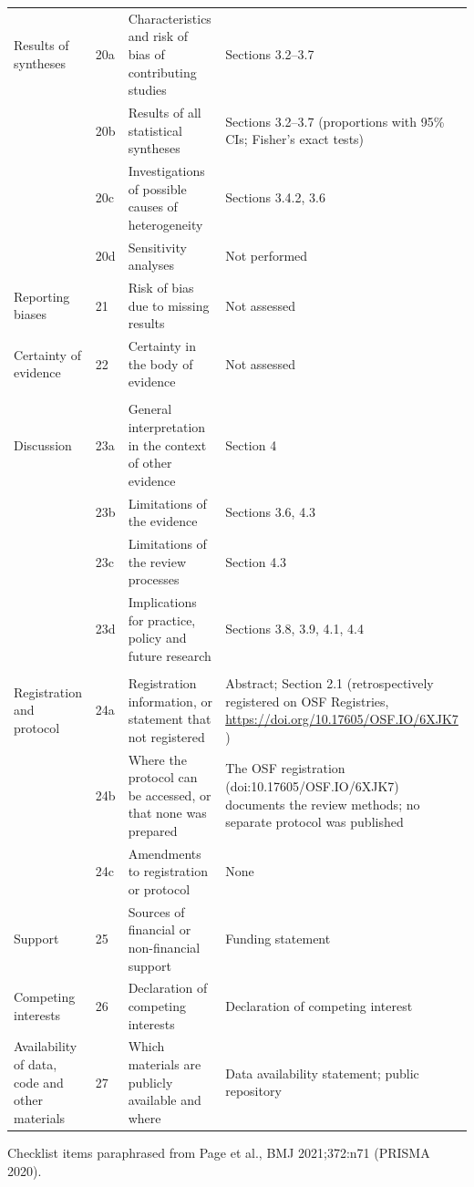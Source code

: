 \begin{longtable}{>{\raggedright\arraybackslash}p{3.6cm} l >{\raggedright\arraybackslash}p{6.2cm} >{\raggedright\arraybackslash}p{5.2cm}}
Results of syntheses & 20a & Characteristics and risk of bias of contributing studies & Sections 3.2--3.7\\
 & 20b & Results of all statistical syntheses & Sections 3.2--3.7 (proportions with 95\% CIs; Fisher's exact tests)\\
 & 20c & Investigations of possible causes of heterogeneity & Sections 3.4.2, 3.6\\
 & 20d & Sensitivity analyses & Not performed\\
Reporting biases & 21 & Risk of bias due to missing results & Not assessed\\
Certainty of evidence & 22 & Certainty in the body of evidence & Not assessed\\
\multicolumn{4}{l}{\textbf{DISCUSSION}}\\
Discussion & 23a & General interpretation in the context of other evidence & Section 4\\
 & 23b & Limitations of the evidence & Sections 3.6, 4.3\\
 & 23c & Limitations of the review processes & Section 4.3\\
 & 23d & Implications for practice, policy and future research & Sections 3.8, 3.9, 4.1, 4.4\\
\multicolumn{4}{l}{\textbf{OTHER INFORMATION}}\\
Registration and protocol & 24a & Registration information, or statement that not registered & Abstract; Section 2.1 (retrospectively registered on OSF Registries, \href{https://doi.org/10.17605/OSF.IO/6XJK7}{https://doi.org/10.17605/OSF.IO/6XJK7} )\\
 & 24b & Where the protocol can be accessed, or that none was prepared & The OSF registration (doi:10.17605/OSF.IO/6XJK7) documents the review methods; no separate protocol was published\\
 & 24c & Amendments to registration or protocol & None\\
Support & 25 & Sources of financial or non-financial support & Funding statement\\
Competing interests & 26 & Declaration of competing interests & Declaration of competing interest\\
Availability of data, code and other materials & 27 & Which materials are publicly available and where & Data availability statement; public repository\\
\end{longtable}
\noindent Checklist items paraphrased from Page et al., BMJ 2021;372:n71 (PRISMA 2020).
